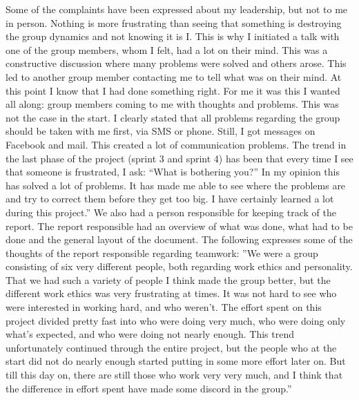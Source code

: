 \newline
\newline
Some of the complaints have been expressed about my leadership, but not to me in person. Nothing is more frustrating than seeing that something is destroying the group dynamics and not knowing it is I. This is why I initiated a talk with one of the group members, whom I felt, had a lot on their mind. This was a constructive discussion where many problems were solved and others arose. This led to another group member contacting me to tell what was on their mind. At this point I know that I had done something right. For me it was this I wanted all along: group members coming to me with thoughts and problems. This was not the case in the start. I clearly stated that all problems regarding the group should be taken with me first, via SMS or phone. Still, I got messages on Facebook and mail. This created a lot of communication problems.
\newline
\newline
The trend in the last phase of the project (sprint 3 and sprint 4) has been that every time I see that someone is frustrated, I ask: “What is bothering you?” In my opinion this has solved a lot of problems. It has made me able to see where the problems are and try to correct them before they get too big. I have certainly learned a lot during this project.''
\newline
\newline
We also had a person responsible for keeping track of the report. The report responsible had an overview of what was done, what had to be done and the general layout of the document. The following expresses some of the thoughts of the report responsible regarding teamwork:
\newline
\newline
''We were a group consisting of six very different people, both regarding work ethics and personality. That we had such a variety of people I think made the group better, but the different work ethics was very frustrating at times. It was not hard to see who were interested in working hard, and who weren’t. The effort spent on this project divided pretty fast into who were doing very much, who were doing only what’s expected, and who were doing not nearly enough. This trend unfortunately continued through the entire project, but the people who at the start did not do nearly enough started putting in some more effort later on. But till this day on, there are still those who work very very much, and I think that the difference in effort spent have made some discord in the group.''
